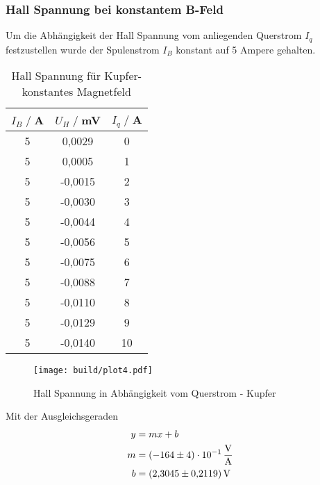 \subsubsection{Hall Spannung bei konstantem B-Feld}
Um die Abhängigkeit der Hall Spannung vom anliegenden Querstrom $I_q$ festzustellen wurde der Spulenstrom $I_B$ konstant auf 5 Ampere gehalten.
\begin{table}[H]
    \centering
    \begin{tabular}{c c c}
        \toprule
        $I_B \;/\;$A & $U_H\;/\;$mV & $I_q \;/\;$A\\
        \midrule
            5                   & 0,0029&             0\\
            5                   & 0,0005&             1\\
            5                   &-0,0015&             2\\
            5                   &-0,0030&             3\\
            5                   &-0,0044&             4\\
            5                   &-0,0056&             5\\
            5                   &-0,0075&             6\\
            5                   &-0,0088&             7\\
            5                   &-0,0110&             8\\
            5                   &-0,0129&             9\\
            5                   &-0,0140&             10\\
        \bottomrule
    \end{tabular}
    \caption{Hall Spannung für Kupfer- konstantes Magnetfeld}
    \label{tab:Cu_I_b}
\end{table}
\begin{figure}[H]
    \centering
    \texttt{[image: build/plot4.pdf]}
    \caption{Hall Spannung in Abhängigkeit vom Querstrom - Kupfer}
    \label{fig:Cu_I}
\end{figure}
Mit der Ausgleichsgeraden
\begin{align*}
    y &= mx + b\\
    m &= \SI{-164 \pm 4 e-01}{\volt \per \ampere}\\  
    b &= \SI{2,3045 \pm 0,2119}{\volt}\\
\end{align*}

